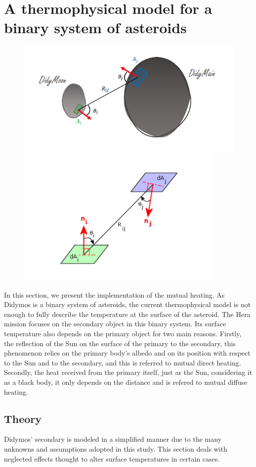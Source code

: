 \section{A thermophysical model for a binary system of asteroids}
\label{sec:4}

\begin{figure}[t]
    \centering
    \includegraphics[width=0.35\linewidth]{rsc/viewfac1.png} 
    \includegraphics[width=0.35\linewidth]{rsc/viewfac2.png}
    \label{fig:4.1}
\end{figure}

In this section, we present the implementation of the mutual heating. As Didymos is a binary system of asteroids, the current thermophysical model is not enough to fully describe the temperature at the surface of the asteroid. The Hera mission focuses on the secondary object in this binary system. Its surface temperature also depends on the primary object for two main reasons. Firstly, the reflection of the Sun on the surface of the primary to the secondary, this phenomenon relies on the primary body's albedo and on its position with respect to the Sun and to the secondary, and this is referred to mutual direct heating. Secondly, the heat received from the primary itself, just as the Sun, considering it as a black body, it only depends on the distance and is refered to mutual diffuse heating.

\subsection{Theory}

Didymos’ secondary is modeled in a simplified manner due to the many unknowns and assumptions adopted in this study. This section deals with neglected effects thought to alter surface temperatures in certain cases.

